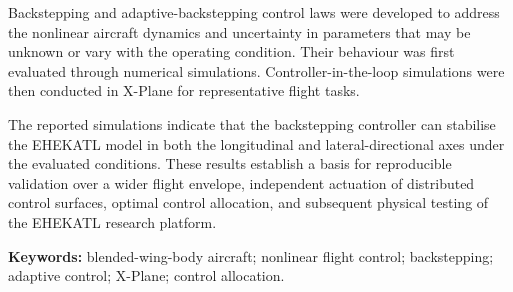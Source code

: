 \documentclass[11pt]{article}
\begin{document}
Backstepping and adaptive-backstepping control laws were developed to address the nonlinear aircraft dynamics and uncertainty in parameters that may be unknown or vary with the operating condition. Their behaviour was first evaluated through numerical simulations. Controller-in-the-loop simulations were then conducted in X-Plane for representative flight tasks.

The reported simulations indicate that the backstepping controller can stabilise the EHEKATL model in both the longitudinal and lateral-directional axes under the evaluated conditions. These results establish a basis for reproducible validation over a wider flight envelope, independent actuation of distributed control surfaces, optimal control allocation, and subsequent physical testing of the EHEKATL research platform.

\vfill
\noindent\textbf{Keywords:} blended-wing-body aircraft; nonlinear flight control; backstepping; adaptive control; X-Plane; control allocation.
\end{document}

